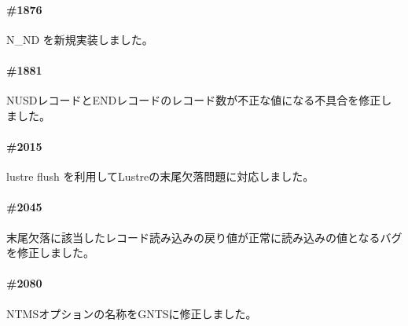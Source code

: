 \paragraph{\#1876}
N\_ND を新規実装しました。

\paragraph{\#1881}
NUSDレコードとENDレコードのレコード数が不正な値になる不具合を修正しました。

\paragraph{\#2015}
lustre flush を利用してLustreの末尾欠落問題に対応しました。

\paragraph{\#2045}
末尾欠落に該当したレコード読み込みの戻り値が正常に読み込みの値となるバグを修正しました。

\paragraph{\#2080}
NTMSオプションの名称をGNTSに修正しました。



